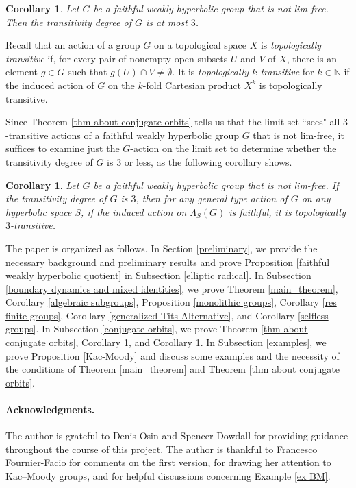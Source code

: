 \documentclass[11pt,letterpaper]{article}
\newcommand{\NN}{\mathbb{N}}
\newtheorem{corA}[thmA]{Corollary}
\theoremstyle{definition}
\theoremstyle{remark}
\begin{document}
\begin{corA}\label{td is leq 3}
Let $G$ be a faithful weakly hyperbolic group that is not lim-free. Then the transitivity degree of $G$ is at most $3$.
\end{corA}

Recall that an action of a group $G$ on a topological space $X$ is {\it topologically transitive} if, for every pair of nonempty open subsets $U$ and $V$ of $X$, there is an element $g \in G$ such that $g(U) \cap V \neq \emptyset$. It is {\it topologically $k$-transitive} for $k \in \NN$ if the induced action of $G$ on the $k$-fold Cartesian product $X^k$ is topologically transitive.

Since Theorem \ref{thm about conjugate orbits} tells us that the limit set ``sees" all $3$-transitive actions of a faithful weakly hyperbolic group $G$ that is not lim-free, it suffices to examine just the $G$-action on the limit set to determine whether the transitivity degree of $G$ is $3$ or less, as the following corollary shows.

\begin{corA}\label{topological 3-transitivity}
Let $G$ be a faithful weakly hyperbolic group that is not lim-free. If the transitivity degree of $G$ is $3$, then for any general type action of $G$ on any hyperbolic space $S$, if the induced action on $\Lambda_S(G)$ is faithful, it is topologically $3$-transitive.
\end{corA}

The paper is organized as follows. In Section \ref{preliminary}, we provide the necessary background and preliminary results and prove Proposition \ref{faithful weakly hyperbolic quotient} in Subsection \ref{elliptic radical}. In Subsection \ref{boundary dynamics and mixed identities}, we prove Theorem \ref{main_theorem}, Corollary \ref{algebraic subgroups}, Proposition \ref{monolithic groups}, Corollary \ref{res finite groups}, Corollary \ref{generalized Tits Alternative}, and Corollary \ref{selfless groups}. In Subsection \ref{conjugate orbits}, we prove Theorem \ref{thm about conjugate orbits}, Corollary \ref{td is leq 3}, and Corollary \ref{topological 3-transitivity}. In Subsection \ref{examples}, we prove Proposition \ref{Kac-Moody} and discuss some examples and the necessity of the conditions of Theorem \ref{main_theorem} and Theorem \ref{thm about conjugate orbits}.

\paragraph{Acknowledgments.}The author is grateful to Denis Osin and Spencer Dowdall for providing guidance throughout the course of this project.
The author is thankful to Francesco Fournier-Facio for comments on the first version, for drawing her attention to Kac–Moody groups, and for helpful discussions concerning Example \ref{ex BM}.
\end{document}
